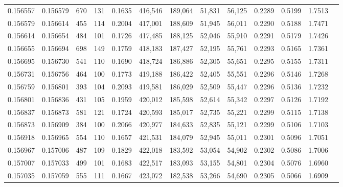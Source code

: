 \begin{tabular}{rrrrrrrrrrrrr}
0.156557 & 0.156579 &   670 & 131 &                                     0.1635 & 416,546 & 189,064 &  51,831 &  56,125 & 0.2289 & 0.5199 & 1.7513 \\
0.156579 & 0.156614 &   455 & 114 &                                     0.2004 & 417,001 & 188,609 &  51,945 &  56,011 & 0.2290 & 0.5188 & 1.7471 \\
0.156614 & 0.156654 &   484 & 101 &                                     0.1726 & 417,485 & 188,125 &  52,046 &  55,910 & 0.2291 & 0.5179 & 1.7426 \\
0.156655 & 0.156694 &   698 & 149 &                                     0.1759 & 418,183 & 187,427 &  52,195 &  55,761 & 0.2293 & 0.5165 & 1.7361 \\
0.156695 & 0.156730 &   541 & 110 &                                     0.1690 & 418,724 & 186,886 &  52,305 &  55,651 & 0.2295 & 0.5155 & 1.7311 \\
0.156731 & 0.156756 &   464 & 100 &                                     0.1773 & 419,188 & 186,422 &  52,405 &  55,551 & 0.2296 & 0.5146 & 1.7268 \\
0.156759 & 0.156801 &   393 & 104 &                                     0.2093 & 419,581 & 186,029 &  52,509 &  55,447 & 0.2296 & 0.5136 & 1.7232 \\
0.156801 & 0.156836 &   431 & 105 &                                     0.1959 & 420,012 & 185,598 &  52,614 &  55,342 & 0.2297 & 0.5126 & 1.7192 \\
0.156837 & 0.156873 &   581 & 121 &                                     0.1724 & 420,593 & 185,017 &  52,735 &  55,221 & 0.2299 & 0.5115 & 1.7138 \\
0.156873 & 0.156909 &   384 & 100 &                                     0.2066 & 420,977 & 184,633 &  52,835 &  55,121 & 0.2299 & 0.5106 & 1.7103 \\
0.156918 & 0.156965 &   554 & 110 &                                     0.1657 & 421,531 & 184,079 &  52,945 &  55,011 & 0.2301 & 0.5096 & 1.7051 \\
0.156967 & 0.157006 &   487 & 109 &                                     0.1829 & 422,018 & 183,592 &  53,054 &  54,902 & 0.2302 & 0.5086 & 1.7006 \\
0.157007 & 0.157033 &   499 & 101 &                                     0.1683 & 422,517 & 183,093 &  53,155 &  54,801 & 0.2304 & 0.5076 & 1.6960 \\
0.157035 & 0.157059 &   555 & 111 &                                     0.1667 & 423,072 & 182,538 &  53,266 &  54,690 & 0.2305 & 0.5066 & 1.6909 \\

\end{tabular}
